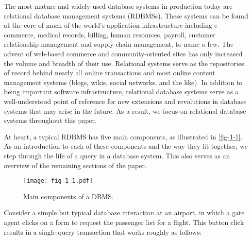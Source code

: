 \documentclass[a4paper,11pt,twoside,openright]{book}
\begin{document}
The most mature and widely used database systems in production today are
relational database management systems (RDBMSs). These systems can be
found at the core of much of the world's application infrastructure
including e-commerce, medical records, billing, human resources,
payroll, customer relationship management and supply chain management,
to name a few. The advent of web-based commerce and community-oriented
sites has only increased the volume and breadth of their use. Relational
systems serve as the repositories of record behind nearly all online
transactions and most online content management systems (blogs, wikis,
social networks, and the like). In addition to being important software
infrastructure, relational database systems serve as a well-understood point of reference for new extensions and revolutions
in database systems that may arise in the future. As a result, we focus
on relational database systems throughout this paper.

At heart, a typical RDBMS has five main components, as illustrated in
\autoref{fig-1-1}. As an introduction to each of these components and the way
they fit together, we step through the life of a query in a database
system. This also serves as an overview of the remaining sections of the
paper.

\begin{figure}
\texttt{[image: fig-1-1.pdf]}

\caption{Main components of a DBMS.\label{fig-1-1}}
\end{figure}

Consider a simple but typical database interaction at an airport, in
which a gate agent clicks on a form to request the passenger list for a
flight. This button click results in a single-query transaction that
works roughly as follows:
\end{document}
